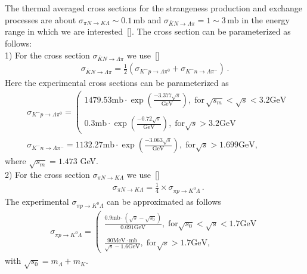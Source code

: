 The thermal averaged cross sections for the strangeness production and exchange processes are about $\sigma_{\pi N\rightarrow K\Lambda}\sim0.1\,\mathrm{mb}$ and $\sigma_{\overline{K}N\rightarrow \Lambda\pi}=1\sim3\,\mathrm{mb}$ in the energy range in which we are interested~[\cite{Koch:1986ud}]. The cross section can be parameterized as follows:\\
1) For the cross section $\sigma_{\overline{K}N\rightarrow \Lambda\pi}$ we use~[\cite{Koch:1986ud}]
 \begin{align}
 \sigma_{\overline{K}N\rightarrow \Lambda\pi}=\frac{1}{2}\left(\sigma_{K^-p\rightarrow \Lambda\pi^0}+\sigma_{K^-n\rightarrow \Lambda\pi^-}\right)\,.
\end{align}
Here the experimental cross sections can be parameterized as 
\begin{align}
&\sigma_{K^-p\rightarrow \Lambda\pi^0}\!\!=\!\!\left(\begin{array}{l}\!\!1479.53\mathrm{mb}\!\cdot\!\exp{\left(\frac{-3.377\sqrt{s}}{\mathrm{GeV}}\right)},\; \mathrm{for}\,\sqrt{s_m}\!\!<\!\!\sqrt{s}\!<\!3.2\mathrm{GeV} \\ \\0.3\mathrm{mb}\!\cdot\!\exp{\left(\frac{-0.72\sqrt{s}}{\mathrm{GeV}}\right)},\; \mathrm{for}\sqrt{s}>3.2\mathrm{GeV}\end{array}\right.\\
&\sigma_{K^-n\rightarrow \Lambda\pi^-}\!\!=\!\!1132.27\mathrm{mb}\!\cdot\!\exp{\left(\frac{-3.063\sqrt{s}}{\mathrm{GeV}}\right)},\; \mathrm{for}\sqrt{s}>1.699\mathrm{GeV},
\end{align}
where $\sqrt{s_m}=1.473$ GeV.\\
2) For the cross section $\sigma_{\pi N\rightarrow K\Lambda}$ we use~[\cite{Cugnon:1984pm}]
\begin{align}
&\sigma_{\pi N\rightarrow K\Lambda}=\frac{1}{4}\times\sigma_{\pi p\rightarrow K^0\Lambda}\,.
\end{align}
The experimental $\sigma_{\pi p\rightarrow K^0\Lambda}$  can be approximated as follows
\begin{align}
\sigma_{\pi p\rightarrow K^0\Lambda}=\left(\begin{array}{l}\frac{0.9\mathrm{mb}\cdot\left(\sqrt{s}-\sqrt{s_0}\right)}{0.091\mathrm{GeV}},\; \mathrm{for} \sqrt{s_0}<\sqrt{s}<1.7\mathrm{GeV} \\ \\ \frac{90\mathrm{MeV\cdot mb}}{\sqrt{s}-1.6\mathrm{GeV}},\; \mathrm{for}\sqrt{s}>1.7\mathrm{GeV},\end{array}\right.
 \end{align}
 with $ \sqrt{s_0}=m_\Lambda+m_K$. 


